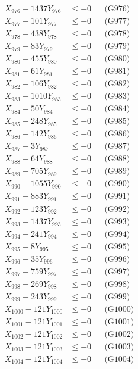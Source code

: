 \documentclass[a4paper,10pt]{article}
\begin{document}
{\begin{align}
X_{976} - 1437Y_{976} &\leq +0 && \text{(G976)} \\
X_{977} - 101Y_{977} &\leq +0 && \text{(G977)} \\
X_{978} - 438Y_{978} &\leq +0 && \text{(G978)} \\
X_{979} - 83Y_{979} &\leq +0 && \text{(G979)} \\
X_{980} - 455Y_{980} &\leq +0 && \text{(G980)} \\
\allowbreak
X_{981} - 61Y_{981} &\leq +0 && \text{(G981)} \\
X_{982} - 106Y_{982} &\leq +0 && \text{(G982)} \\
X_{983} - 1010Y_{983} &\leq +0 && \text{(G983)} \\
X_{984} - 50Y_{984} &\leq +0 && \text{(G984)} \\
X_{985} - 248Y_{985} &\leq +0 && \text{(G985)} \\
X_{986} - 142Y_{986} &\leq +0 && \text{(G986)} \\
X_{987} - 3Y_{987} &\leq +0 && \text{(G987)} \\
X_{988} - 64Y_{988} &\leq +0 && \text{(G988)} \\
X_{989} - 705Y_{989} &\leq +0 && \text{(G989)} \\
X_{990} - 1055Y_{990} &\leq +0 && \text{(G990)} \\
\allowbreak
X_{991} - 883Y_{991} &\leq +0 && \text{(G991)} \\
X_{992} - 123Y_{992} &\leq +0 && \text{(G992)} \\
X_{993} - 1437Y_{993} &\leq +0 && \text{(G993)} \\
X_{994} - 241Y_{994} &\leq +0 && \text{(G994)} \\
X_{995} - 8Y_{995} &\leq +0 && \text{(G995)} \\
X_{996} - 35Y_{996} &\leq +0 && \text{(G996)} \\
X_{997} - 759Y_{997} &\leq +0 && \text{(G997)} \\
X_{998} - 269Y_{998} &\leq +0 && \text{(G998)} \\
X_{999} - 243Y_{999} &\leq +0 && \text{(G999)} \\
X_{1000} - 121Y_{1000} &\leq +0 && \text{(G1000)} \\
\allowbreak
X_{1001} - 121Y_{1001} &\leq +0 && \text{(G1001)} \\
X_{1002} - 121Y_{1002} &\leq +0 && \text{(G1002)} \\
X_{1003} - 121Y_{1003} &\leq +0 && \text{(G1003)} \\
X_{1004} - 121Y_{1004} &\leq +0 && \text{(G1004)} \\

\end{align}}
\end{document}
